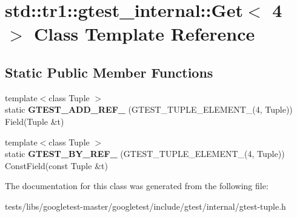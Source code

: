 \hypertarget{classstd_1_1tr1_1_1gtest__internal_1_1Get_3_014_01_4}{}\section{std\+:\+:tr1\+:\+:gtest\+\_\+internal\+:\+:Get$<$ 4 $>$ Class Template Reference}
\label{classstd_1_1tr1_1_1gtest__internal_1_1Get_3_014_01_4}
\subsection*{Static Public Member Functions}
\begin{DoxyCompactItemize}
\item 
\mbox{\label{classstd_1_1tr1_1_1gtest__internal_1_1Get_3_014_01_4_a5c7a91c681118bb7253e305f8ff42be4}} 
{\footnotesize template$<$class Tuple $>$ }\\static {\bfseries G\+T\+E\+S\+T\+\_\+\+A\+D\+D\+\_\+\+R\+E\+F\+\_\+} (G\+T\+E\+S\+T\+\_\+\+T\+U\+P\+L\+E\+\_\+\+E\+L\+E\+M\+E\+N\+T\+\_\+(4, Tuple)) Field(Tuple \&t)
\item 
\mbox{\label{classstd_1_1tr1_1_1gtest__internal_1_1Get_3_014_01_4_a04794c398bbe81e4de0915b79da2166a}} 
{\footnotesize template$<$class Tuple $>$ }\\static {\bfseries G\+T\+E\+S\+T\+\_\+\+B\+Y\+\_\+\+R\+E\+F\+\_\+} (G\+T\+E\+S\+T\+\_\+\+T\+U\+P\+L\+E\+\_\+\+E\+L\+E\+M\+E\+N\+T\+\_\+(4, Tuple)) Const\+Field(const Tuple \&t)
\end{DoxyCompactItemize}


The documentation for this class was generated from the following file\+:\begin{DoxyCompactItemize}
\item 
tests/libs/googletest-\/master/googletest/include/gtest/internal/gtest-\/tuple.\+h\end{DoxyCompactItemize}
